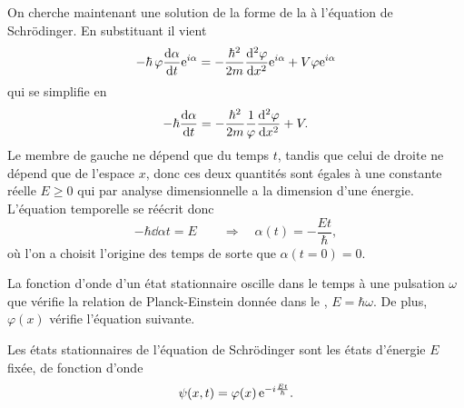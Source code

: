 \documentclass[12pt,fancy]{cours}
\begin{document}

On cherche maintenant une solution de la forme de la  à l'équation de Schrödinger. En substituant il vient
\begin{equation}
-\hbar\,\varphi\frac{\mathrm{d}\alpha}{\mathrm{d} t}\mathrm{e}^{i\alpha}=-\frac{\hbar^2}{2m}\frac{\mathrm{d}^2{\varphi}}{\mathrm{d}{x}^2}\mathrm{e}^{i\alpha}+V\varphi\mathrm{e}^{i\alpha}
\end{equation}
qui se simplifie en
\begin{equation}
-\hbar\frac{\mathrm{d}\alpha}{\mathrm{d} t} =-\frac{\hbar^2}{2m}\frac{1}{\varphi}\frac{\mathrm{d}^2{\varphi}}{\mathrm{d}{x}^2}+V.
\end{equation}
Le membre de gauche ne dépend que du temps $t$, tandis que celui de droite ne dépend que de l'espace $x$, donc ces deux quantités sont égales à une constante réelle $E\geq 0$ qui par analyse dimensionnelle a la dimension d'une énergie. L'équation temporelle se réécrit donc
\begin{equation}
-\hbar\dd{\alpha}{t}=E \qquad\Rightarrow\quad \alpha(t)=-\frac{Et}{\hbar},
\end{equation}
où l’on a choisit l’origine des temps de sorte que $\alpha(t=0)=0$.

La fonction d’onde d’un état stationnaire oscille dans le temps à une pulsation $\omega$ que vérifie la relation  de Planck-Einstein donnée dans le ,
$
  E=\hbar\omega.
$
De plus, $\varphi(x)$ vérifie l’équation  suivante.

\begin{prop}\label{form:schro_stat}
  Les états stationnaires de l'équation de Schrödinger sont les états d'énergie $E$ fixée, de fonction d'onde
  \begin{equation*}
  \psi(x,t)=\varphi(x)\,\mathrm{e}^{-i\frac{Et}{\hbar}}.
  \label{eqn:etat_stat3}
\end{equation*}
\end{prop}
\end{document}
